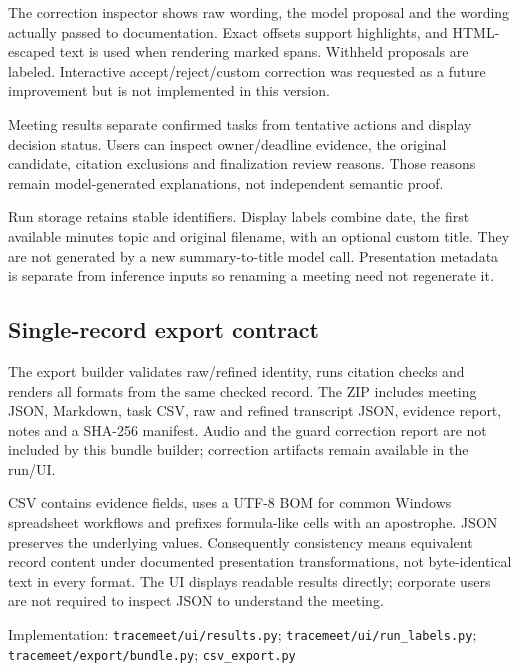 \documentclass[11pt,a4paper]{article}
\newcommand{\code}[1]{\nolinkurl{#1}}
\newcommand{\src}[1]{\par{\footnotesize\raggedright\textcolor{accent}{Implementation:} #1\par}}
\begin{document}
The correction inspector shows raw wording, the model proposal and the wording actually passed to documentation. Exact offsets support highlights, and HTML-escaped text is used when rendering marked spans. Withheld proposals are labeled. Interactive accept/reject/custom correction was requested as a future improvement but is not implemented in this version.

Meeting results separate confirmed tasks from tentative actions and display decision status. Users can inspect owner/deadline evidence, the original candidate, citation exclusions and finalization review reasons. Those reasons remain model-generated explanations, not independent semantic proof.

Run storage retains stable identifiers. Display labels combine date, the first available minutes topic and original filename, with an optional custom title. They are not generated by a new summary-to-title model call. Presentation metadata is separate from inference inputs so renaming a meeting need not regenerate it.

\subsection{Single-record export contract}
The export builder validates raw/refined identity, runs citation checks and renders all formats from the same checked record. The ZIP includes meeting JSON, Markdown, task CSV, raw and refined transcript JSON, evidence report, notes and a SHA-256 manifest. Audio and the guard correction report are not included by this bundle builder; correction artifacts remain available in the run/UI.

CSV contains evidence fields, uses a UTF-8 BOM for common Windows spreadsheet workflows and prefixes formula-like cells with an apostrophe. JSON preserves the underlying values. Consequently consistency means equivalent record content under documented presentation transformations, not byte-identical text in every format. The UI displays readable results directly; corporate users are not required to inspect JSON to understand the meeting.
\src{\code{tracemeet/ui/results.py}; \code{tracemeet/ui/run_labels.py}; \code{tracemeet/export/bundle.py}; \code{csv_export.py}}
\end{document}
